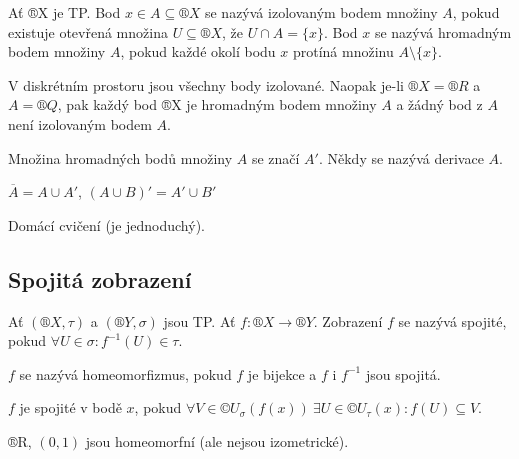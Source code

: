 \documentclass[12pt]{article}					%
\begin{document}
        \begin{definice}
            Ať ®X je TP. Bod $x \in A \subseteq ®X$ se nazývá izolovaným bodem množiny $A$, pokud existuje otevřená množina $U \subseteq ®X$, že $U \cap A = \{x\}$. Bod $x$ se nazývá hromadným bodem množiny $A$, pokud každé okolí bodu $x$ protíná množinu $A \setminus \{x\}$.

            \begin{prikladyin}
                V diskrétním prostoru jsou všechny body izolované. Naopak je-li $®X = ®R$ a $A = ®Q$, pak každý bod ®X je hromadným bodem množiny $A$ a žádný bod z $A$ není izolovaným bodem $A$.
            \end{prikladyin}
        \end{definice}

        \begin{definice}
            Množina hromadných bodů množiny $A$ se značí $A'$. Někdy se nazývá derivace $A$.
        \end{definice}

        \begin{tvrzeni}
            $\overline{A} = A \cup A'$, $(A \cup B)' = A' \cup B'$
            \begin{dukazin}
                Domácí cvičení (je jednoduchý).
            \end{dukazin}
        \end{tvrzeni}

    \subsection{Spojitá zobrazení}
        \begin{definice}
            Ať $(®X, \tau)$ a $(®Y, \sigma)$ jsou TP. Ať $f: ®X \rightarrow ®Y$. Zobrazení $f$ se nazývá spojité, pokud $\forall U \in \sigma: f^{-1}(U) \in \tau$.

            $f$ se nazývá homeomorfizmus, pokud $f$ je bijekce a $f$ i $f^{-1}$ jsou spojitá.

            $f$ je spojité v bodě $x$, pokud $\forall V \in ©U_\sigma(f(x))\ \exists U \in ©U_\tau(x): f(U) \subseteq V$.
        \end{definice}

        \begin{priklady}
            ®R, $(0, 1)$ jsou homeomorfní (ale nejsou izometrické).
        \end{priklady}
\end{document}
